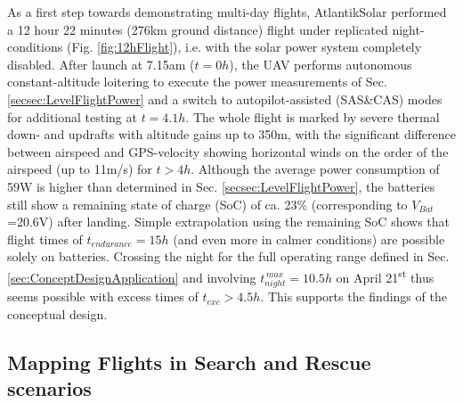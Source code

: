 As a first step towards demonstrating multi-day flights, AtlantikSolar performed a 12 hour 22 minutes (276km ground distance) flight under replicated night-conditions (Fig. \ref{fig:12hFlight}), i.e. with the solar power system completely disabled. After launch at 7.15am ($t=0h$), the UAV performs autonomous constant-altitude loitering to execute the power measurements of Sec. \ref{secsec:LevelFlightPower} and a switch to autopilot-assisted (SAS\&CAS) modes for additional testing at $t=4.1h$. The whole flight is marked by severe thermal down- and updrafts with altitude gains up to 350m, with the significant difference between airspeed and GPS-velocity showing horizontal winds on the order of the airspeed (up to 11m/s) for $t>4h$. Although the average power consumption of 59W is higher than determined in Sec. \ref{secsec:LevelFlightPower}, the batteries still show a remaining state of charge (SoC) of ca. 23\% (corresponding to $V_{Bat}$=20.6V) after landing. Simple extrapolation using the remaining SoC shows that flight times of $t_{endurance}=15h$ (and even more in calmer conditions) are possible solely on batteries. Crossing the night for the full operating range defined in Sec. \ref{sec:ConceptDesignApplication} and involving $t_{night}^{\,max}=10.5h$ on April 21\textsuperscript{st} thus seems possible with excess times of $t_{exc}>4.5h$. This supports the findings of the conceptual design. 

\subsection{Mapping Flights in Search and Rescue scenarios}


